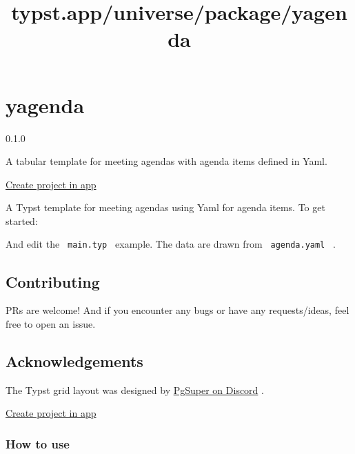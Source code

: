 \title{typst.app/universe/package/yagenda}

\label{banner}
\label{template-thumbnail}

\section{yagenda}\label{yagenda}

{ 0.1.0 }

A tabular template for meeting agendas with agenda items defined in
Yaml.

\href{/app?template=yagenda&version=0.1.0}{Create project in app}

\label{readme}
A Typst template for meeting agendas using Yaml for agenda items. To get
started:

\begin{Shaded}
\begin{Highlighting}[]
\end{Highlighting}
\end{Shaded}

And edit the \texttt{\ main.typ\ } example. The data are drawn from
\texttt{\ agenda.yaml\ } .


\subsection{Contributing}\label{contributing}

PRs are welcome! And if you encounter any bugs or have any
requests/ideas, feel free to open an issue.

\subsection{Acknowledgements}\label{acknowledgements}

The Typst grid layout was designed by
\href{https://discord.com/channels/1054443721975922748/1219401775908655115}{PgSuper
on Discord} .

\href{/app?template=yagenda&version=0.1.0}{Create project in app}

\subsubsection{How to use}\label{how-to-use}


